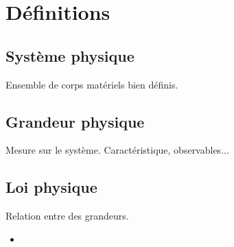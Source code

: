 

\section{Définitions}

  \subsection{Système physique}
Ensemble de corps matériels bien définis.

  \subsection{Grandeur physique}
Mesure sur le système. Caractéristique, observables...

  \subsection{Loi physique}
Relation entre des grandeurs.

	\begin{itemize}[leftmargin=1cm, label=, itemsep=1pt]
		\item 
	\end{itemize}



